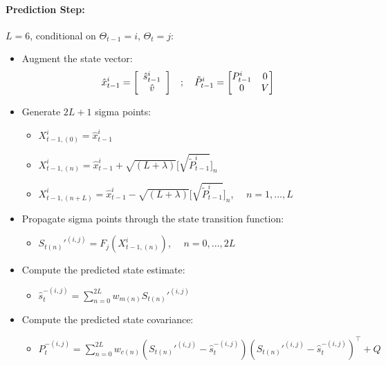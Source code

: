 \documentclass[12pt,letter,leqno]{article}
\theoremstyle{asn}
\theoremstyle{lem}
\theoremstyle{slem}
\theoremstyle{prop}
\theoremstyle{appprop}
\theoremstyle{rem}
\theoremstyle{defn}
\begin{document}
\paragraph{Prediction Step:}
$L=6$, conditional on $\Theta_{t-1}=i$, $\Theta_t=j$:
\begin{itemize}
\item Augment the state vector:
\begin{equation*}
  \begin{split}
    \hat{x}_{t-1}^i =  \left[
                    \begin{array}[c]{c}%
                        \hat{s}_{t-1}^i\\
                        \hat{v}
                    \end{array} \right]  &   
    \end{split}
    ;\quad
    \begin{split}
    \tilde{P}^i_{t-1} = 
            \begin{bmatrix}
                P_{t-1}^i & 0 \\
                  0 & V
            \end{bmatrix}
    \end{split}
\end{equation*}

\item Generate $2L+1$ sigma points:
\begin{itemize}
\item $X_{t-1,(0)}^i =\hat{x}_{t-1}^i$
\item $X_{t-1,(n)}^i =\hat{x}_{t-1}^i + \sqrt{(L+\lambda)}\big[\sqrt{\tilde{P}_{t-1}^i}\big]_n$
\item $X_{t-1,(n+L)}^i =\hat{x}_{t-1}^i - \sqrt{(L+\lambda)}\big[\sqrt{\tilde{P}_{t-1}^i}\big]_n$, $\quad  n=1,...,L$
\end{itemize}
\item Propagate sigma points through the state transition function:
\begin{itemize}
\item $S_{t(n)}'^{(i,j)} = F_j(X_{t-1,(n)}^i)$, $\quad  n=0,...,2L$
\end{itemize}
\item Compute the predicted state estimate:
\begin{itemize}
\item $\hat{s}_t^{-(i,j)} = \sum_{n=0}^{2L} w_{m(n)} S_{t(n)}'^{(i,j)}$
\end{itemize}
\item Compute the predicted state covariance:
\begin{itemize}
\item $P_t^{-(i,j)} = \sum_{n=0}^{2L} w_{c(n)} (S_{t(n)}'^{(i,j)} - \hat{s}_t^{-(i,j)})(S_{t(n)}'^{(i,j)} - \hat{s}_t^{-(i,j)})^\top + Q$
\end{itemize}
\end{itemize}
\end{document}
